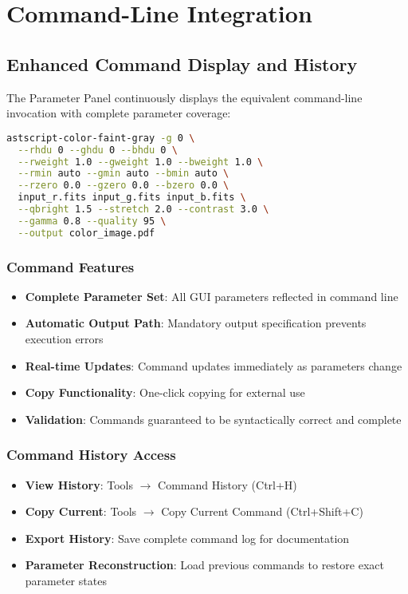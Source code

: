 \documentclass[11pt,a4paper]{article}
\begin{document}
\section{Command-Line Integration}

\subsection{Enhanced Command Display and History}

The Parameter Panel continuously displays the equivalent command-line
invocation with complete parameter coverage:

\begin{lstlisting}[language=bash]
astscript-color-faint-gray -g 0 \
  --rhdu 0 --ghdu 0 --bhdu 0 \
  --rweight 1.0 --gweight 1.0 --bweight 1.0 \
  --rmin auto --gmin auto --bmin auto \
  --rzero 0.0 --gzero 0.0 --bzero 0.0 \
  input_r.fits input_g.fits input_b.fits \
  --qbright 1.5 --stretch 2.0 --contrast 3.0 \
  --gamma 0.8 --quality 95 \
  --output color_image.pdf
\end{lstlisting}

\subsubsection{Command Features}

\begin{itemize}[leftmargin=*]
\item \textbf{Complete Parameter Set}: All GUI parameters reflected in
command line
\item \textbf{Automatic Output Path}: Mandatory output specification
prevents execution errors  
\item \textbf{Real-time Updates}: Command updates immediately as parameters
change
\item \textbf{Copy Functionality}: One-click copying for external use
\item \textbf{Validation}: Commands guaranteed to be syntactically correct
and complete
\end{itemize}

\subsubsection{Command History Access}

\begin{itemize}[leftmargin=*]
\item \textbf{View History}: Tools $\rightarrow$ Command History (Ctrl+H)
\item \textbf{Copy Current}: Tools $\rightarrow$ Copy Current Command
(Ctrl+Shift+C)
\item \textbf{Export History}: Save complete command log for documentation
\item \textbf{Parameter Reconstruction}: Load previous commands to restore
exact parameter states
\end{itemize}
\end{document}
